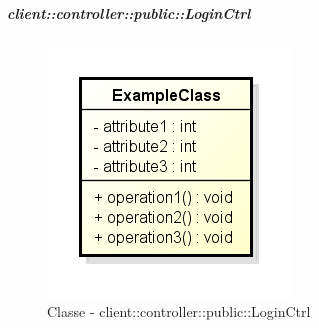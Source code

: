 		\subparagraph{client::controller::public::LoginCtrl} %
		\label{subp:bdsm_app_client_controller_public_loginctrl}
			\begin{figure}[htbp]
				\centering
				\centerline{\includegraphics[scale=0.7]{./images/client/classes/example_class.png}}
				\caption{Classe - client::controller::public::LoginCtrl}
			\end{figure}

